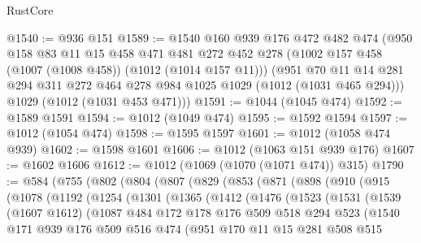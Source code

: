 \begin{lexlean}{RustCore}
\begin{coremodule}
@1540 := @936 @151
@1589 := @1540
    @160
    @939
    @176
    @472
    @482
    @474
    (@950
      @158
      @83
      @11
      @15
      @458
      @471
      @481
      @272
      @452
      @278
      (@1002 @157 @458 (@1007 (@1008 @458)) (@1012 (@1014 @157 @11)))
      (@951 @70 @11 @14 @281 @294 @311 @272 @464 @278 @984 @1025 @1029 (@1012 (@1031 @465 @294)))
      @1029
      (@1012 (@1031 @453 @471)))
@1591 := @1044 (@1045 @474)
@1592 := @1589 @1591
@1594 := @1012 (@1049 @474)
@1595 := @1592 @1594
@1597 := @1012 (@1054 @474)
@1598 := @1595 @1597
@1601 := @1012 (@1058 @474 @939)
@1602 := @1598 @1601
@1606 := @1012 (@1063 @151 @939 @176)
@1607 := @1602 @1606
@1612 := @1012 (@1069 (@1070 (@1071 @474)) @315)
@1790 := @584
    (@755
      (@802
        (@804
          (@807
            (@829
              (@853
                (@871
                  (@898
                    (@910
                      (@915
                        (@1078
                          (@1192
                            (@1254
                              (@1301
                                (@1365
                                  (@1412
                                    (@1476
                                      (@1523
                                        (@1531
                                          (@1539
                                            (@1607 @1612)
                                            (@1087
                                              @484
                                              @172
                                              @178
                                              @176
                                              @509
                                              @518
                                              @294
                                              @523
                                              (@1540
                                                @171
                                                @939
                                                @176
                                                @509
                                                @516
                                                @474
                                                (@951
                                                  @170
                                                  @11
                                                  @15
                                                  @281
                                                  @508
                                                  @515

\end{coremodule}
\end{lexlean}

